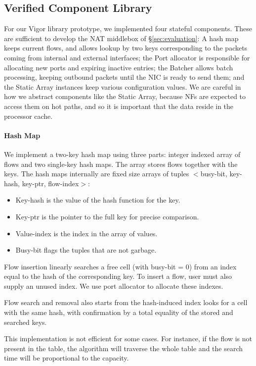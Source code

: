 \documentclass[letterpaper,twocolumn,10pt]{article}
\begin{document}
\subsection{Verified Component Library}

For our Vigor library prototype, we implemented four stateful components. These are sufficient to develop the NAT middlebox of \S\ref{sec:evaluation}: A hash map keeps current flows, and allows lookup by two keys corresponding to the packets coming from internal and external interfaces; the Port allocator is responsible for allocating new ports and expiring inactive entries; the Batcher allows batch processing, keeping outbound packets until the NIC is ready to send them; and the Static Array instances keep various configuration values. We are careful in how we abstract components like the Static Array, because NFs are expected to access them on hot paths, and so it is important that the data reside in the processor cache.

\paragraph{Hash Map}

We implement a two-key hash map using three parts: integer indexed array of flows and two single-key hash maps. The array stores flows together with the keys. The hash maps internally are fixed size arrays of tuples $<$busy-bit, key-hash, key-ptr, flow-index$>$:
\begin{itemize}
    \item Key-hash is the value of the hash function for the key.
    \item Key-ptr is the pointer to the full key for precise comparison.
    \item Value-index is the index in the array of values.
    \item Busy-bit flags the tuples that are not garbage.
\end{itemize}


Flow insertion linearly searches a free cell (with busy-bit = 0) from an index equal to the hash of the corresponding key. To insert a flow, user must also supply an unused index. We use port allocator to allocate these indexes.

Flow search and removal also starts from the hash-induced index looks for a cell with the same hash, with confirmation by a total equality of the stored and searched keys.

This implementation is not efficient for some cases. For instance, if the flow is not present in the table, the algorithm will traverse the whole table and the search time will be proportional to the capacity.
\end{document}
